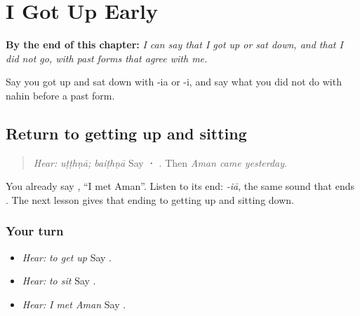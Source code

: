 
\chapter{I Got Up Early}
\label{ch:pa-a2-uthia}

\begin{chapteropening}
\textbf{By the end of this chapter:} \emph{I can say that I got up or sat down, and that I did not go, with past forms that agree with me.}

Say you got up and sat down with -ia or -i, and say what you did not do with nahin before a past form.
\end{chapteropening}

\section[\texorpdfstring{\pa{ਉੱਠਣਾ} · \pa{ਬੈਠਣਾ} · \pa{ਆਇਆ} (uṭṭhṇā · baiṭhṇā …)}{ਉੱਠਣਾ · ਬੈਠਣਾ · ਆਇਆ (uṭṭhṇā · baiṭhṇā …)}]{Return to getting up and sitting}

\label{lesson:PA-C218-body-return}



\begin{quote}
\emph{Hear:} \emph{uṭṭhṇā; baiṭhṇā} Say \textbf{ · }. Then \emph{Aman came yesterday}.
\end{quote}

\begin{grammarlens}[title={Grammar Lens}]
You already say \textbf{   }, \textquotedblleft{}I met Aman\textquotedblright{}. Listen to its end: \emph{-iā}, the same sound that ends \textbf{}. The next lesson gives that ending to getting up and sitting down.
\end{grammarlens}

\subsection*{Your turn}
\begin{itemize}
\raggedright
  \item \emph{Hear:} \emph{to get up} Say \textbf{}.
  \item \emph{Hear:} \emph{to sit} Say \textbf{}.
  \item \emph{Hear:} \emph{I met Aman} Say \textbf{   }.
\end{itemize}

